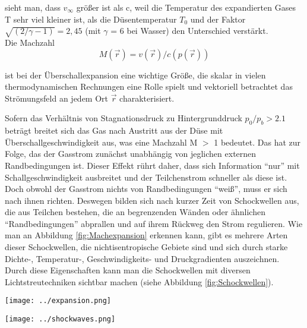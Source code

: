 sieht man, dass $v_{\infty}$ größer ist als c, weil die Temperatur des expandierten Gases T sehr viel kleiner ist, als die Düsentemperatur $T_0$ und der Faktor $\sqrt{(2/\gamma -1)}=2,45$ (mit $\gamma$ = 6 bei Wasser) den Unterschied verstärkt.\\
Die Machzahl 
\begin{equation}
M(\vec{r})= v(\vec{r})/c(p(\vec{r}))
\end{equation}

ist bei der Überschallexpansion eine wichtige Größe, die skalar in vielen thermodynamischen Rechnungen eine Rolle spielt und vektoriell betrachtet das Strömungsfeld an jedem Ort $\vec{r}$ charakterisiert. 

Sofern das Verhältnis von Stagnationsdruck zu Hintergrunddruck $p_0/p_b > 2.1$ beträgt breitet sich das Gas nach Austritt aus der Düse mit Überschallgeschwindigkeit aus, was eine Machzahl M $>$ 1 bedeutet. Das hat zur Folge, das der Gasstrom zunächst unabhängig von jeglichen externen Randbedingungen ist. Dieser Effekt rührt daher, dass sich Information \enquote{nur} mit Schallgeschwindigkeit ausbreitet und der Teilchenstrom schneller als diese ist. Doch obwohl der Gasstrom nichts von Randbedingungen \enquote{weiß}, muss er sich nach ihnen richten. Deswegen bilden sich nach kurzer Zeit von Schockwellen aus, die aus Teilchen bestehen, die an begrenzenden Wänden oder ähnlichen \enquote{Randbedingungen} abprallen und auf ihrem Rückweg den Strom regulieren. Wie man an Abbildung \ref{fig:Machexpansion} erkennen kann, gibt es mehrere Arten dieser Schockwellen, die nichtisentropische Gebiete sind und sich durch starke Dichte-, Temperatur-, Geschwindigkeits- und Druckgradienten auszeichnen. Durch diese Eigenschaften kann man die Schockwellen mit diversen Lichtstreutechniken sichtbar machen \cite{Mou09} (siehe Abbildung \ref{fig:Schockwellen}).
%
\begin{center}
\begin{minipage}{\linewidth}
\centering
\texttt{[image: ../expansion.png]}%
 \label{fig:Machexpansion}
\end{minipage} 
\end{center} 
%
\begin{center}
\begin{minipage}{\linewidth}
\centering
\texttt{[image: ../shockwaves.png]}%
 \label{fig:Schockwellen}
\end{minipage} 
\end{center} 
